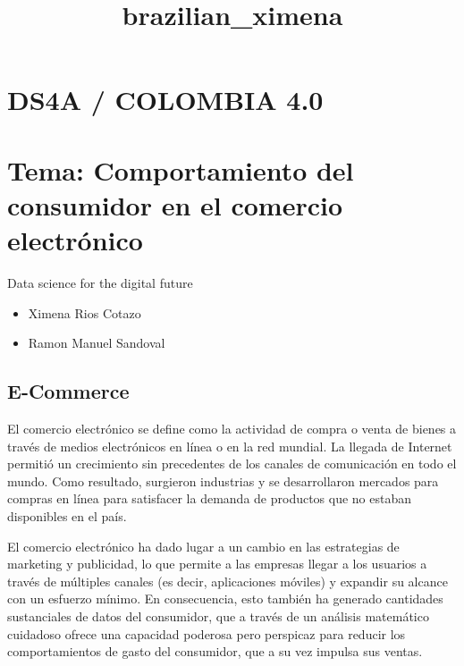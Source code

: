 \documentclass[11pt]{article}
\title{brazilian\_ximena}
\begin{document}
    
    
    \maketitle
    
    

    
    \hypertarget{ds4a-colombia-4.0}{%
\section{DS4A / COLOMBIA 4.0}\label{ds4a-colombia-4.0}}

\hypertarget{tema-comportamiento-del-consumidor-en-el-comercio-electruxf3nico}{%
\section{Tema: Comportamiento del consumidor en el comercio
electrónico}\label{tema-comportamiento-del-consumidor-en-el-comercio-electruxf3nico}}

Data science for the digital future

\begin{itemize}
\item
  Ximena Rios Cotazo
\item
  Ramon Manuel Sandoval
\end{itemize}

    \hypertarget{e-commerce}{%
\subsection{E-Commerce}\label{e-commerce}}

El comercio electrónico se define como la actividad de compra o venta de
bienes a través de medios electrónicos en línea o en la red mundial. La
llegada de Internet permitió un crecimiento sin precedentes de los
canales de comunicación en todo el mundo. Como resultado, surgieron
industrias y se desarrollaron mercados para compras en línea para
satisfacer la demanda de productos que no estaban disponibles en el
país.

El comercio electrónico ha dado lugar a un cambio en las estrategias de
marketing y publicidad, lo que permite a las empresas llegar a los
usuarios a través de múltiples canales (es decir, aplicaciones móviles)
y expandir su alcance con un esfuerzo mínimo. En consecuencia, esto
también ha generado cantidades sustanciales de datos del consumidor, que
a través de un análisis matemático cuidadoso ofrece una capacidad
poderosa pero perspicaz para reducir los comportamientos de gasto del
consumidor, que a su vez impulsa sus ventas.
\end{document}
